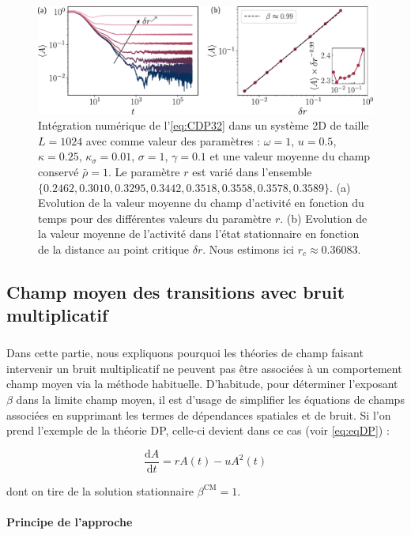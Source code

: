 \begin{figure}[h]
	\centering
	\includegraphics[width=\textwidth]{Chapitre5/Figures/MFCDP32.pdf}
	\caption{Intégration numérique de l'\autoref{eq:CDP32} dans un système 2D de taille $L=1024$ avec comme valeur des paramètres : $\omega = 1$, $u = 0.5$, $\kappa = 0.25$, $\kappa_\sigma = 0.01$, $\sigma = 1$, $\gamma = 0.1$ et une valeur moyenne du champ conservé $\bar{\rho} = 1$. Le paramètre $r$ est varié dans l'ensemble $\{ 0.2462, 0.3010, 0.3295, 0.3442, 0.3518, 0.3558, 0.3578, 0.3589\}$. (a) Evolution de la valeur moyenne du champ d'activité en fonction du temps pour des différentes valeurs du paramètre $r$. (b) Evolution de la valeur moyenne de l'activité dans l'état stationnaire en fonction de la distance au point critique $\delta r$. Nous estimons ici $r_c \approx 0.36083$.}
	\label{fig:MFCDP32}
\end{figure}

\subsection{Champ moyen des transitions avec bruit multiplicatif}

\subparagraph{}Dans cette partie, nous expliquons pourquoi les théories de champ faisant intervenir un bruit multiplicatif ne peuvent pas être associées à un comportement champ moyen via la méthode habituelle. D'habitude, pour déterminer l'exposant $\beta$ dans la limite champ moyen, il est d'usage de simplifier les équations de champs associées en supprimant les termes de dépendances spatiales et de bruit. Si l'on prend l'exemple de la théorie DP, celle-ci devient dans ce cas (voir \autoref{eq:eqDP}) :

\begin{equation}
	\frac{\mathrm{d}A}{\mathrm{d}t} = rA(t) - u A^2(t)
\end{equation}

\noindent dont on tire de la solution stationnaire $\beta^\text{CM} = 1$.

\paragraph{Principe de l'approche}

